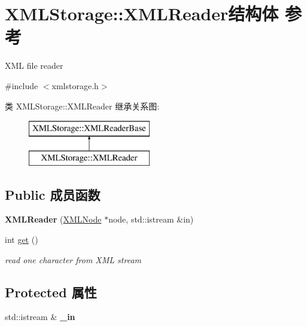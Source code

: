 \hypertarget{struct_x_m_l_storage_1_1_x_m_l_reader}{}\section{X\+M\+L\+Storage\+:\+:X\+M\+L\+Reader结构体 参考}
\label{struct_x_m_l_storage_1_1_x_m_l_reader}


X\+ML file reader  




{\ttfamily \#include $<$xmlstorage.\+h$>$}

类 X\+M\+L\+Storage\+:\+:X\+M\+L\+Reader 继承关系图\+:\begin{figure}[H]
\begin{center}
\leavevmode
\includegraphics[height=2.000000cm]{struct_x_m_l_storage_1_1_x_m_l_reader}
\end{center}
\end{figure}
\subsection*{Public 成员函数}
\begin{DoxyCompactItemize}
\item 
\mbox{\label{struct_x_m_l_storage_1_1_x_m_l_reader_a5ae3055ad1d9ab9ed8665ae17fe86c97}} 
{\bfseries X\+M\+L\+Reader} (\hyperlink{struct_x_m_l_storage_1_1_x_m_l_node}{X\+M\+L\+Node} $\ast$node, std\+::istream \&in)
\item 
\mbox{\label{struct_x_m_l_storage_1_1_x_m_l_reader_a386b8dd05184d78a2fc8c474895ac502}} 
int \hyperlink{struct_x_m_l_storage_1_1_x_m_l_reader_a386b8dd05184d78a2fc8c474895ac502}{get} ()
\begin{DoxyCompactList}\small\item\em read one character from X\+ML stream \end{DoxyCompactList}\end{DoxyCompactItemize}
\subsection*{Protected 属性}
\begin{DoxyCompactItemize}
\item 
\mbox{\label{struct_x_m_l_storage_1_1_x_m_l_reader_a3227efcec987aed25267f58e93455fca}} 
std\+::istream \& {\bfseries \+\_\+in}
\end{DoxyCompactItemize}
